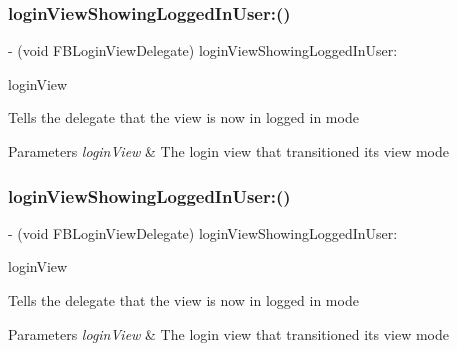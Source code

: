\subsubsection{\texorpdfstring{login\+View\+Showing\+Logged\+In\+User\+:()}{loginViewShowingLoggedInUser:()}\hspace{0.1cm}{\footnotesize\ttfamily [4/5]}}
{\footnotesize\ttfamily -\/ (void F\+B\+Login\+View\+Delegate) login\+View\+Showing\+Logged\+In\+User\+: \begin{DoxyParamCaption}\item[{(\hyperlink{interfaceFBLoginView}{F\+B\+Login\+View} $\ast$)}]{login\+View }\end{DoxyParamCaption}\hspace{0.3cm}{\ttfamily [optional]}}

Tells the delegate that the view is now in logged in mode


\begin{DoxyParams}{Parameters}
{\em login\+View} & The login view that transitioned its view mode \\
\hline
\end{DoxyParams}
\mbox{\label{protocolFBLoginViewDelegate_01-p_a1f8604ad00171b432bdb0e4582856db9}} 
\subsubsection{\texorpdfstring{login\+View\+Showing\+Logged\+In\+User\+:()}{loginViewShowingLoggedInUser:()}\hspace{0.1cm}{\footnotesize\ttfamily [5/5]}}
{\footnotesize\ttfamily -\/ (void F\+B\+Login\+View\+Delegate) login\+View\+Showing\+Logged\+In\+User\+: \begin{DoxyParamCaption}\item[{(\hyperlink{interfaceFBLoginView}{F\+B\+Login\+View} $\ast$)}]{login\+View }\end{DoxyParamCaption}\hspace{0.3cm}{\ttfamily [optional]}}

Tells the delegate that the view is now in logged in mode


\begin{DoxyParams}{Parameters}
{\em login\+View} & The login view that transitioned its view mode \\
\hline
\end{DoxyParams}
\mbox{\label{protocolFBLoginViewDelegate_01-p_a39d98ab433b5919a9e1e96388bbdc691}} 

